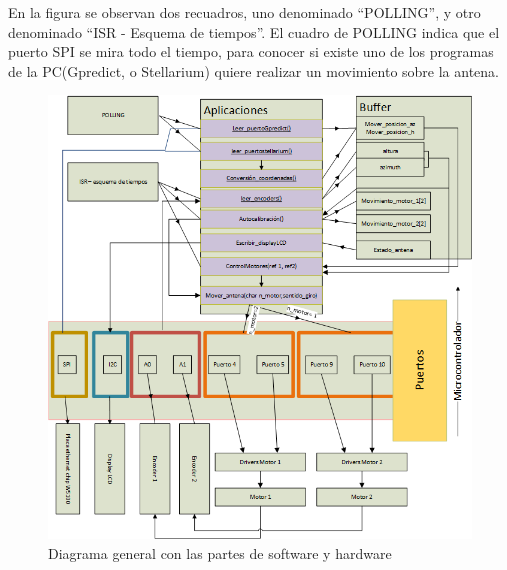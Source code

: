 En la figura se observan dos recuadros, uno denominado ``POLLING'', y otro denominado ``ISR - Esquema de tiempos''. El cuadro de POLLING indica que el puerto SPI se mira todo el tiempo, para conocer si existe uno de los programas de la PC(Gpredict, o Stellarium) quiere realizar un movimiento sobre la antena. 


\begin{figure}[ht!]
	\raggedleft
	\includegraphics[width=\linewidth]{software_diagrama_general}
	\caption{Diagrama general con las partes de software y hardware}
	\label{fig:software_diagrama_general}
\end{figure}


\vspace{20mm}

